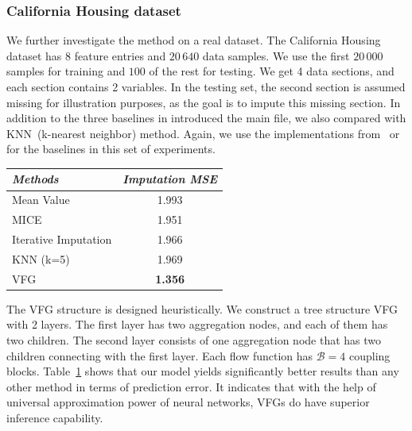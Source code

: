 \documentclass[sigconf, anonymous, review]{acmart}
\theoremstyle{plain}
\theoremstyle{definition}
\theoremstyle{remark}
\begin{document}
\subsubsection{California Housing dataset} 
We further investigate the method on a real dataset. 
The California Housing dataset  has 8 feature entries and $20\,640$ data samples. 
We use the first $20\,000$ samples for training  and $100$ of the rest for testing.  
We get  4 data sections, and each section contains 2 variables. 
In the testing set, the second section is assumed missing for illustration purposes, as the goal is to impute this missing section. In addition to the three baselines in introduced the main file, we also compared with KNN~(k-nearest neighbor) method. Again,  we use the  implementations from~\cite{scikit-learn} or~\cite{Impyute}  for the baselines in this set of  experiments. 

\begin{table}[b!]
\centering
{} \label{tab:imp_arrhytmia}
 \begin{tabular}{l | c  }\hline
\textit{Methods} & \textit{Imputation MSE}  \\
\hline
Mean Value &1.993 \\
MICE & 1.951\\
Iterative Imputation & 1.966\\
KNN (k=5) &1.969 \\
\hline
VFG & \textbf{1.356} \\  
\hline
\end{tabular}
\end{table}



The VFG structure is designed heuristically. We construct a tree structure VFG with 2 layers. The first layer has two aggregation nodes, and each of them has two children. 
The second layer consists of one aggregation node that has two children connecting with the first layer.  
Each flow function has $\mathcal{B}=4$ coupling blocks. 
 Table~\ref{tab:imp_arrhytmia} shows that our model yields significantly better results than any other method in terms of prediction error. It indicates that with the help of universal approximation power of neural networks, VFGs do have superior inference capability.
\end{document}
